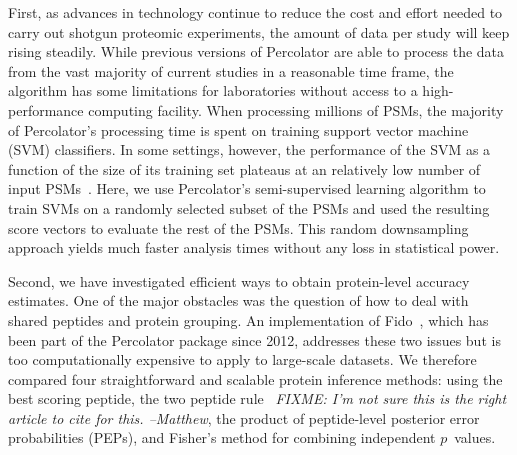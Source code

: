\documentclass{article}
\begin{document}
First, as advances in technology continue to reduce the cost and
effort needed to carry out shotgun proteomic experiments, the amount
of data per study will keep rising steadily. While previous versions
of Percolator are able to process the data from the vast majority of
current studies in a reasonable time frame, the algorithm has some
limitations for laboratories without access to a high-performance
computing facility. When processing millions of PSMs, the majority of
Percolator's processing time is spent on training support vector
machine (SVM) classifiers.  In some settings, however, the performance
of the SVM as a function of the size of its training set plateaus at
an relatively low number of input PSMs~\cite{gonnelli2015decoy}. Here,
we use Percolator's semi-supervised learning algorithm to train SVMs
on a randomly selected subset of the PSMs and used the resulting score
vectors to evaluate the rest of the PSMs.  This random downsampling
approach yields much faster analysis times without any loss in
statistical power.

Second, we have investigated efficient ways to obtain protein-level
accuracy estimates. One of the major obstacles was the question of how
to deal with shared peptides and protein grouping. An implementation
of Fido~\cite{serang2010efficient}, which has been part of the
Percolator package since 2012, addresses these two issues but is too
computationally expensive to apply to large-scale datasets. We
therefore compared four straightforward and scalable protein inference
methods: using the best scoring peptide, the two peptide
rule~\cite{carr2004need} {\em FIXME: I'm not sure this is the right
article to cite for this. --Matthew}, the product of peptide-level
posterior error probabilities (PEPs), and Fisher's method for
combining independent $p$~values.
\end{document}
